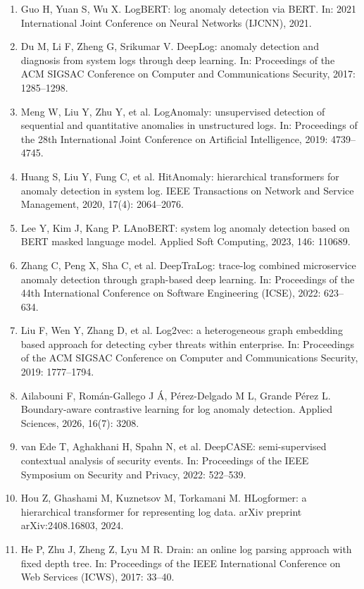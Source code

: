 \documentclass[11pt,a4paper]{article}
\begin{document}
\begin{enumerate}[label={\arabic*.},leftmargin=1.6em,itemsep=1pt]
\item Guo H, Yuan S, Wu X. LogBERT: log anomaly detection via BERT. In: 2021
International Joint Conference on Neural Networks (IJCNN), 2021.
\item Du M, Li F, Zheng G, Srikumar V. DeepLog: anomaly detection and diagnosis from
system logs through deep learning. In: Proceedings of the ACM SIGSAC Conference on
Computer and Communications Security, 2017: 1285--1298.
\item Meng W, Liu Y, Zhu Y, et al. LogAnomaly: unsupervised detection of sequential and
quantitative anomalies in unstructured logs. In: Proceedings of the 28th International
Joint Conference on Artificial Intelligence, 2019: 4739--4745.
\item Huang S, Liu Y, Fung C, et al. HitAnomaly: hierarchical transformers for anomaly
detection in system log. IEEE Transactions on Network and Service Management, 2020,
17(4): 2064--2076.
\item Lee Y, Kim J, Kang P. LAnoBERT: system log anomaly detection based on BERT masked
language model. Applied Soft Computing, 2023, 146: 110689.
\item Zhang C, Peng X, Sha C, et al. DeepTraLog: trace-log combined microservice anomaly
detection through graph-based deep learning. In: Proceedings of the 44th International
Conference on Software Engineering (ICSE), 2022: 623--634.
\item Liu F, Wen Y, Zhang D, et al. Log2vec: a heterogeneous graph embedding based
approach for detecting cyber threats within enterprise. In: Proceedings of the ACM SIGSAC
Conference on Computer and Communications Security, 2019: 1777--1794.
\item Ailabouni F, Rom\'an-Gallego J \'A, P\'erez-Delgado M L, Grande P\'erez L.
Boundary-aware contrastive learning for log anomaly detection. Applied Sciences, 2026,
16(7): 3208.
\item van Ede T, Aghakhani H, Spahn N, et al. DeepCASE: semi-supervised contextual
analysis of security events. In: Proceedings of the IEEE Symposium on Security and
Privacy, 2022: 522--539.
\item Hou Z, Ghashami M, Kuznetsov M, Torkamani M. HLogformer: a hierarchical transformer
for representing log data. arXiv preprint arXiv:2408.16803, 2024.
\item He P, Zhu J, Zheng Z, Lyu M R. Drain: an online log parsing approach with fixed
depth tree. In: Proceedings of the IEEE International Conference on Web Services (ICWS),
2017: 33--40.
\end{enumerate}
\end{document}
